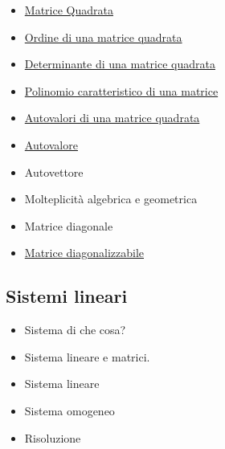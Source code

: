 \documentclass[a4paper,10pt]{article}
\begin{document}
\begin{itemize}
   \item \href{MatriceQuadrata.html}{Matrice Quadrata}
   \item \href{OrdineMatrice.html}{Ordine di una matrice quadrata}
   \item \href{DeterminanteMatrice.html}{Determinante di una matrice quadrata}
   \item \href{PolinomioMatrice.html}{Polinomio caratteristico di una matrice}
   \item \href{AutovaloriMatrice.html}{Autovalori di una matrice quadrata}
   \item \href{Autovalore.html}{Autovalore}
   \item Autovettore
   \item Molteplicità algebrica e geometrica
   \item Matrice diagonale
   \item \href{MatriceDiagonalizzabile.html}{Matrice diagonalizzabile}
\end{itemize}

\subsection{Sistemi lineari}
  \begin{itemize}
   \item Sistema di che cosa?
   \item Sistema lineare e matrici.
   \item Sistema lineare
   \item Sistema omogeneo
   \item Risoluzione
  \end{itemize}
  
\end{document}
